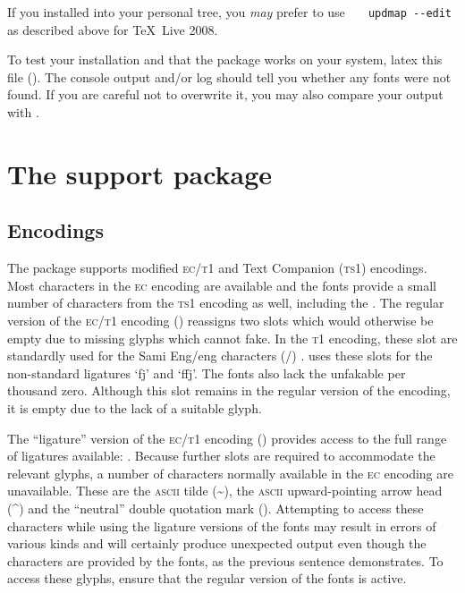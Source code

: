 \documentclass[11pt,british]{article}
\begin{document}
If you installed into your personal tree, you \emph{may} prefer to use \verb|	updmap --edit| as described above for \TeX~Live 2008.

To test your installation and that the package works on your system, latex this file (). The console output and/or log should tell you whether any fonts were not found. If you are careful not to overwrite it, you may also compare your output with .

\section{The support package}\label{sec:support}

\subsection{Encodings}\label{sec:encs}

The package supports modified \textsc{ec}/\textsc{t1} and Text Companion (\textsc{ts1}) encodings. Most characters in the \textsc{ec} encoding are available and the fonts provide a small number of characters from the \textsc{ts1} encoding as well, including the \texteuro. The regular version of the \textsc{ec}/\textsc{t1} encoding () reassigns two slots which would otherwise be empty due to missing glyphs which  cannot fake. In the \textsc{t1} encoding, these slot are standardly used for the Sami Eng/eng characters (\textorigrm{\NG}/\textorigrm{\ng}) .  uses these slots for the non-standard ligatures `fj' and `ffj'. The fonts also lack the unfakable per thousand zero. Although this slot remains in the regular version of the encoding, it is empty due to the lack of a suitable glyph.

The ``ligature'' version of the \textsc{ec}/\textsc{t1} encoding () provides access to the full range of ligatures available: . Because further slots are required to accommodate the relevant glyphs, a number of characters normally available in the \textsc{ec} encoding are unavailable. These are the \textsc{ascii} tilde (\textasciitilde), the \textsc{ascii} upward-pointing arrow head (\textasciicircum) and the ``neutral'' double quotation mark (\textquotedbl). Attempting to access these characters while using the ligature versions of the fonts may result in errors of various kinds and will certainly produce unexpected output even though the characters are provided by the fonts, as the previous sentence demonstrates. To access these glyphs, ensure that the regular version of the fonts is active.
\end{document}
